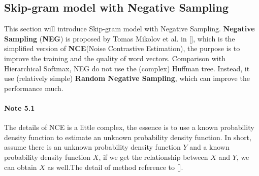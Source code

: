 \documentclass[12pt,a4paper,twoside]{book}
\begin{document}
\subsection{Skip-gram model with Negative Sampling}
This section will introduce Skip-gram model with Negative Sampling. \textbf{Negative Sampling} (\textbf{NEG}) is proposed by Tomas Mikolov et al. in [], which is the simplified version of \textbf{NCE}(Noise Contrastive Estimation), the purpose is to improve the training and the quality of word vectors. Comparison with Hierarchical Softmax, NEG do not use the (complex) Huffman tree. Instead, it use (relatively simple) \textbf{Random Negative Sampling}, which can improve the performance much.
\paragraph{Note 5.1} The details of NCE is a little complex, the essence is to use a known probability density function to estimate an unknown probability density function. In short, assume there is an unknown probability density function $Y$ and a known probability density function $X$, if we get the relationship between $X$ and $Y$, we can obtain $X$ as well.The detail of method reference to []. 
\end{document}
